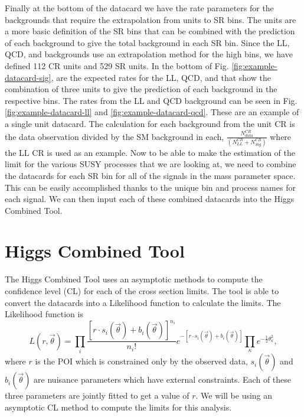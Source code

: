 Finally at the bottom of the datacard we have the rate parameters for the backgrounds that require the extrapolation from units to SR bins. The units are a more basic definition of the SR bins that can be combined with the prediction of each background to give the total background in each SR bin. Since the LL, QCD, and \Znunu{} backgrounds use an extrapolation method for the high \dm{} bins, we have defined 112 CR units and 529 SR units. In the bottom of Fig. \ref{fig:example-datacard-sig}, are the expected rates for the LL, QCD, and \Znunu{} that show the combination of three units to give the prediction of each background in the respective bins. The rates from the LL and QCD background can be seen in Fig. \ref{fig:example-datacard-ll} and \ref{fig:example-datacard-qcd}. These are an example of a single unit datacard. The calculation for each background from the unit CR is the data observation divided by the SM background in each, $\frac{N_{data}^{CR}}{(N_{LL}^{CR} + N_{Sig}^{CR})}$ where the LL CR is used as an example. Now to be able to make the estimation of the limit for the various SUSY processes that we are looking at, we need to combine the datacards for each SR bin for all of the signals in the mass parameter space. This can be easily accomplished thanks to the unique bin and process names for each signal. We can then input each of these combined datacards into the Higgs Combined Tool.

\section{Higgs Combined Tool}\label{sec:HiggsCombined}

The Higgs Combined Tool uses an asymptotic methods to compute the confidence level (CL) for each of the cross section limits. The tool is able to convert the datacards into a Likelihood function to calculate the limits. The Likelihood function is 
\begin{equation}\label{eqn:likelihood}
L(r,\overrightarrow{\theta})=\prod_i \frac{[r\cdot s_i(\overrightarrow{\theta})+b_i(\overrightarrow{\theta})]^{n_i}}{n_i !}e^{-[r\cdot s_i(\overrightarrow{\theta})+b_i(\overrightarrow{\theta})]}\prod_\kappa e^{-\frac{1}{2}\theta^2_\kappa},
\end{equation}
where $r$ is the POI which is constrained only by the observed data, $s_i(\overrightarrow{\theta})$ and $b_i(\overrightarrow{\theta})$ are nuisance parameters which have external constraints. Each of these three parameters are jointly fitted to get a value of $r$. We will be using an asymptotic CL method to compute the limits for this analysis. 